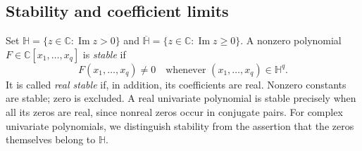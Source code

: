 \documentclass[reqno, 12pt]{article}
\numberwithin{equation}{section}
\theoremstyle{definition}
\newcommand{\CC}{\mathbb C}
\begin{document}
\subsection{Stability and coefficient limits}

Set $\mathbb H=\{z\in\CC:\operatorname{Im}z>0\}$ and $\overline{\mathbb H}=\{z\in\CC:\operatorname{Im}z \geq 0\}$.
A nonzero polynomial $F\in\CC[x_1,\ldots,x_q]$ is \emph{stable} if
\[F(x_1,\ldots,x_q)\ne0 \quad\text{whenever }(x_1,\ldots,x_q)\in\mathbb H^q.\]
It is called \emph{real stable} if, in addition, its coefficients are real.
Nonzero constants are stable; zero is excluded.  A real univariate
polynomial is stable precisely when all its zeros are real, since
nonreal zeros occur in conjugate pairs.  For complex univariate
polynomials, we distinguish stability from the assertion that the
zeros themselves belong to $\mathbb H$.
\end{document}
